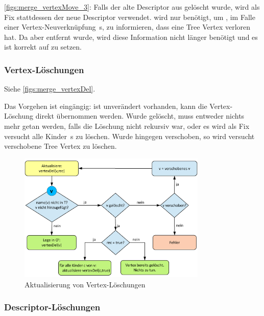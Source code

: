 \autoref{figs:merge_vertexMove_3}: Falls der alte Descriptor  aus  gelöscht wurde, wird als Fix stattdessen der neue Descriptor  verwendet.  wird nur benötigt, um , im Falle einer Vertex-Neuverknüpfung \,s, zu informieren, dass  eine Tree Vertex verloren hat. Da  aber entfernt wurde, wird diese Information nicht länger benötigt und es ist korrekt  auf  zu setzen.

\subsubsection{Vertex-Löschungen}

Siehe \autoref{figs:merge_vertexDel}. \par

Das Vorgehen ist eingängig: ist  unverändert vorhanden, kann die Vertex-Löschung direkt übernommen werden. Wurde  gelöscht, muss entweder nichts mehr getan werden, falls die Löschung nicht rekursiv war, oder es wird als Fix versucht alle Kinder \,s zu löschen. Wurde  hingegen verschoben, so wird versucht verschobene Tree Vertex zu löschen. 

\begin{figure}
\begin{center}
\includegraphics[width=0.80\textwidth]{figs/merge_vertexDel.pdf}
\end{center}
\caption{Aktualisierung von Vertex-Löschungen}
\label{figs:merge_vertexDel}
\end{figure}

\subsubsection{Descriptor-Löschungen}

